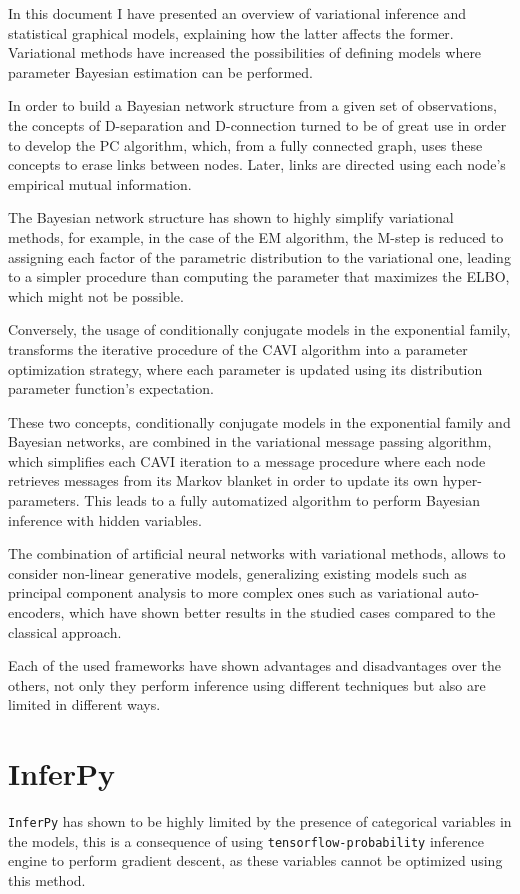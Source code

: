 

In this document I have presented an overview of variational inference and statistical graphical models, explaining how the latter affects the former. Variational methods have increased the possibilities of defining models where parameter Bayesian estimation can be performed.

In order to build a Bayesian network structure from a given set of observations, the concepts of D-separation and D-connection turned to be of great use in order to develop the PC algorithm, which, from a fully connected graph, uses these concepts to erase links between nodes. Later, links are directed using each node's empirical mutual information.

The Bayesian network structure has shown to highly simplify variational methods, for example, in the case of the EM algorithm, the M-step is reduced to assigning each factor of the parametric distribution to the variational one, leading to a simpler procedure than computing the parameter that maximizes the ELBO, which might not be possible.

Conversely, the usage of conditionally conjugate models in the exponential family, transforms the iterative procedure of the CAVI algorithm into a parameter optimization strategy, where each parameter is updated using its distribution parameter function's expectation.

These two concepts, conditionally conjugate models in the exponential family and Bayesian networks, are combined in the variational message passing algorithm, which simplifies each CAVI iteration to a message procedure where each node retrieves messages from its Markov blanket in order to update its own hyper-parameters. This leads to a fully automatized algorithm to perform Bayesian inference with hidden variables.

The combination of artificial neural networks with variational methods, allows to consider non-linear generative models, generalizing existing models such as principal component analysis to more complex ones such as variational auto-encoders, which have shown better results in the studied cases compared to the classical approach.

Each of the used frameworks have shown advantages and disadvantages over the others, not only they perform inference using different techniques but also are limited in different ways.

\section*{InferPy}
\texttt{InferPy} has shown to be highly limited by the presence of categorical variables in the models, this is a consequence of using \texttt{tensorflow-probability} inference engine to perform gradient descent, as these variables cannot be optimized using this method.

